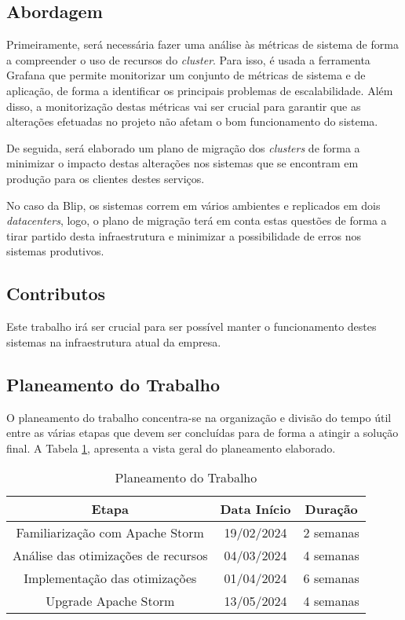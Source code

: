 \subsection{Abordagem}

Primeiramente, será necessária fazer uma análise às métricas de sistema de forma a compreender
o uso de recursos do \textit{cluster}. Para isso, é usada a ferramenta Grafana que permite
monitorizar um conjunto de métricas de sistema e de aplicação, de forma a identificar os principais
problemas de escalabilidade. Além disso, a monitorização destas métricas vai ser crucial para
garantir que as alterações efetuadas no projeto não afetam o bom funcionamento do sistema.

De seguida, será elaborado um plano de migração dos \textit{clusters} de forma a minimizar o 
impacto destas alterações nos sistemas que se encontram em produção para os clientes destes serviços.

No caso da Blip, os sistemas correm em vários ambientes e replicados em dois \textit{datacenters},
logo, o plano de migração terá em conta estas questões de forma a tirar partido desta infraestrutura
e minimizar a possibilidade de erros nos sistemas produtivos.

\subsection{Contributos}

Este trabalho irá ser crucial para ser possível manter o funcionamento destes sistemas na
infraestrutura atual da empresa.


\subsection{Planeamento do Trabalho}

O planeamento do trabalho concentra-se na organização e divisão do tempo útil entre as várias etapas
que devem ser concluídas para de forma a atingir a solução final. A Tabela \ref{tab:plan}, apresenta 
a vista geral do planeamento elaborado.

\begin{table}[H]
  \begin{center}
    \caption{Planeamento do Trabalho}
    \vspace{5mm}
    \label{tab:plan}
    \begin{tabular}{|c|c|c|}
      \hline
      \textbf{Etapa} & \textbf{Data Início} & \textbf{Duração} \\ \hline
      Familiarização com Apache Storm  & 19/02/2024 & 2 semanas \\ \hline
      Análise das otimizações de recursos & 04/03/2024 & 4 semanas \\ \hline
      Implementação das otimizações & 01/04/2024 & 6 semanas \\ \hline
      Upgrade Apache Storm & 13/05/2024 & 4 semanas \\ \hline
    \end{tabular}
  \end{center}
\end{table}


